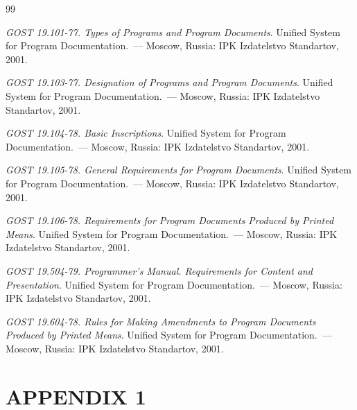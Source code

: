 \documentclass[12pt,a4paper]{extarticle}
\begin{document}
\renewcommand{\refname}{}
\begin{thebibliography}{99}
\vspace{-1cm}

\emph{GOST 19.101-77. Types of Programs and Program Documents}. Unified System for Program Documentation.~--- Moscow, Russia: IPK Izdatelstvo Standartov, 2001.

\emph{GOST 19.103-77. Designation of Programs and Program Documents}. Unified System for Program Documentation.~--- Moscow, Russia: IPK Izdatelstvo Standartov, 2001.

\emph{GOST 19.104-78. Basic Inscriptions}. Unified System for Program Documentation.~--- Moscow, Russia: IPK Izdatelstvo Standartov, 2001.

\emph{GOST 19.105-78. General Requirements for Program Documents}. Unified System for Program Documentation.~--- Moscow, Russia: IPK Izdatelstvo Standartov, 2001.

\emph{GOST 19.106-78. Requirements for Program Documents Produced by Printed Means}. Unified System for Program Documentation.~--- Moscow, Russia: IPK Izdatelstvo Standartov, 2001.

\emph{GOST 19.504-79. Programmer's Manual. Requirements for Content and Presentation}. Unified System for Program Documentation.~--- Moscow, Russia: IPK Izdatelstvo Standartov, 2001.

\emph{GOST 19.604-78. Rules for Making Amendments to Program Documents Produced by Printed Means}. Unified System for Program Documentation.~--- Moscow, Russia: IPK Izdatelstvo Standartov, 2001.

\end{thebibliography}

\clearpage

\section*{APPENDIX 1}
\end{document}
